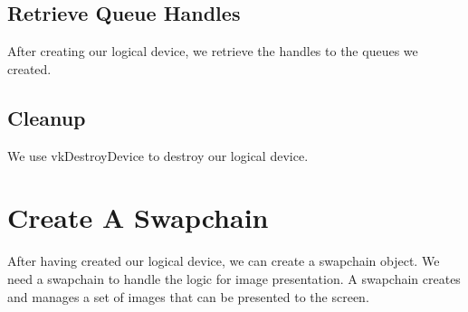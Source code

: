 \begin{minipage}{\linewidth}{\noindent}
    
\end{minipage}

\begin{minipage}{\linewidth}{\noindent}
    
\end{minipage}

\subsection{Retrieve Queue Handles}

After creating our logical device, we retrieve the handles to the
queues we created.

\begin{minipage}{\linewidth}{\noindent}
    
\end{minipage}

\subsection{Cleanup}

We use vkDestroyDevice to destroy our logical device.

\section{Create A Swapchain}

After having created our logical device, we can create a swapchain object.
We need a swapchain to handle the logic for image presentation.
A swapchain creates and manages a set of images that can be presented to the screen.

\begin{minipage}{\linewidth}{\noindent}
    
\end{minipage}

